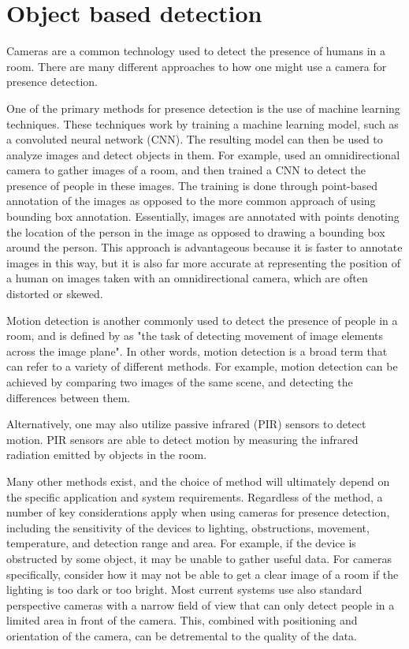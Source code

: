 \section{Object based detection} \label{sec:object-based-detection}
Cameras are a common technology used to detect the presence of humans in a room.
There are many different approaches to how one might use a camera for presence detection.

One of the primary methods for presence detection is the use of machine learning techniques.
These techniques work by training a machine learning model, such as a convoluted neural network (CNN).
The resulting model can then be used to analyze images and detect objects in them.
For example, \citeauthor{FUERTES2022103473}\cite{FUERTES2022103473} used an omnidirectional camera to gather images of a room, and then trained a CNN to detect the presence of people in these images.
The training is done through point-based annotation of the images as opposed to the more common approach of using bounding box annotation.
Essentially, images are annotated with points denoting the location of the person in the image as opposed to drawing a bounding box around the person.
This approach is advantageous because it is faster to annotate images in this way, but it is also far more accurate at representing the position of a human on images taken with an omnidirectional camera, which are often distorted or skewed.\cite{FUERTES2022103473}

Motion detection is another commonly used to detect the presence of people in a room, and is defined by \citeauthor{ANANDAN1988347}\cite{ANANDAN1988347} as "the task of detecting movement of image elements across the image plane".
In other words, motion detection is a broad term that can refer to a variety of different methods.
For example, motion detection can be achieved by comparing two images of the same scene, and detecting the differences between them\cite{granath_detecting_nodate}.

Alternatively, one may also utilize passive infrared (PIR) sensors to detect motion.
PIR sensors are able to detect motion by measuring the infrared radiation emitted by objects in the room.\cite{Deiana2014}

Many other methods exist, and the choice of method will ultimately depend on the specific application and system requirements. 
Regardless of the method, a number of key considerations apply when using cameras for presence detection, including the sensitivity of the devices to lighting, obstructions, movement, temperature, and detection range and area.
For example, if the device is obstructed by some object, it may be unable to gather useful data.
For cameras specifically, consider how it may not be able to get a clear image of a room if the lighting is too dark or too bright.
Most current systems use also standard perspective cameras with a narrow field of view that can only detect people in a limited area in front of the camera\cite{FUERTES2022103473}.
This, combined with positioning and orientation of the camera, can be detremental to the quality of the data.\cite{granath_detecting_nodate, tang_occupancy_2020}

